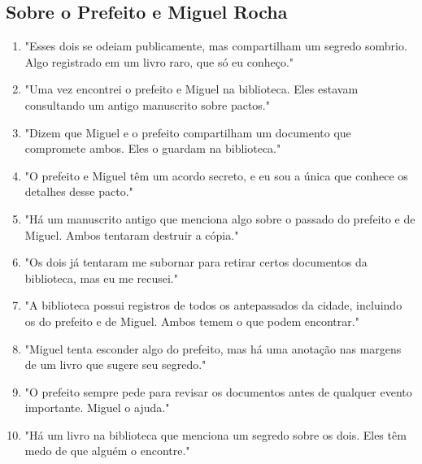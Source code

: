 \subsection*{Sobre o Prefeito e Miguel Rocha}
\begin{enumerate}
    \item "Esses dois se odeiam publicamente, mas compartilham um segredo sombrio. Algo registrado em um livro raro, que só eu conheço."
    \item "Uma vez encontrei o prefeito e Miguel na biblioteca. Eles estavam consultando um antigo manuscrito sobre pactos."
    \item "Dizem que Miguel e o prefeito compartilham um documento que compromete ambos. Eles o guardam na biblioteca."
    \item "O prefeito e Miguel têm um acordo secreto, e eu sou a única que conhece os detalhes desse pacto."
    \item "Há um manuscrito antigo que menciona algo sobre o passado do prefeito e de Miguel. Ambos tentaram destruir a cópia."
    \item "Os dois já tentaram me subornar para retirar certos documentos da biblioteca, mas eu me recusei."
    \item "A biblioteca possui registros de todos os antepassados da cidade, incluindo os do prefeito e de Miguel. Ambos temem o que podem encontrar."
    \item "Miguel tenta esconder algo do prefeito, mas há uma anotação nas margens de um livro que sugere seu segredo."
    \item "O prefeito sempre pede para revisar os documentos antes de qualquer evento importante. Miguel o ajuda."
    \item "Há um livro na biblioteca que menciona um segredo sobre os dois. Eles têm medo de que alguém o encontre."
\end{enumerate}

